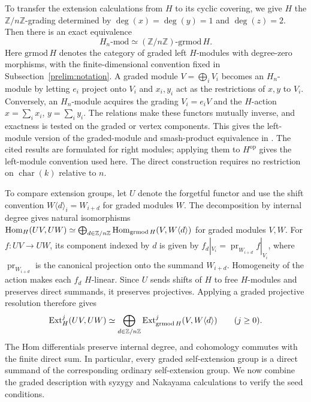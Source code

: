 \documentclass[11pt]{article}
\begin{document}
To transfer the extension calculations from $H$ to its cyclic
covering, we give $H$ the $\mathbb Z/n\mathbb Z$-grading determined by
$\deg(x)=\deg(y)=1$ and $\deg(z)=2$.  Then there is an exact equivalence
\begin{equation}\label{family:graded-equivalence}
 H_n\text{-}\mathrm{mod}\simeq
 (\mathbb Z/n\mathbb Z)\text{-}\mathrm{grmod}\,H.
\end{equation}
Here $\mathrm{grmod}\,H$ denotes the category of graded left
$H$-modules with degree-zero morphisms, with the finite-dimensional
convention fixed in Subsection~\ref{prelim:notation}.
A graded module $V=\bigoplus_iV_i$ becomes an $H_n$-module by letting
$e_i$ project onto $V_i$ and $x_i,y_i$ act as the restrictions of
$x,y$ to $V_i$.  Conversely, an $H_n$-module acquires the grading
$V_i=e_iV$ and the $H$-action $x=\sum_i x_i$, $y=\sum_i y_i$.
The relations make these functors mutually inverse, and exactness
is tested on the graded or vertex components. This gives the left-module version
of the graded-module and smash-product equivalence in
\cite[Theorems~1.3 and~2.1]{NR}. The cited results are formulated
for right modules; applying them to $H^{\mathrm{op}}$ gives the
left-module convention used here. The direct construction requires
no restriction on $\operatorname{char}(k)$ relative to $n$.

To compare extension groups, let $U$ denote the forgetful functor and
use the shift convention $W\langle d\rangle_i=W_{i+d}$ for graded
modules $W$. The decomposition by internal degree gives natural
isomorphisms ${\rm Hom}_H(UV,UW)\simeq
\bigoplus_{d\in\mathbb Z/n\mathbb Z}{\rm Hom}_{\mathrm{grmod}\,H}(V,W\langle d\rangle)$
for graded modules $V,W$. For $f:UV\to UW$, its component indexed
by $d$ is given by
$f_d|_{V_i}=\operatorname{pr}_{W_{i+d}}f|_{V_i}$, where $\operatorname{pr}_{W_{i+d}}$ is the canonical projection onto the summand $W_{i+d}$.
Homogeneity of the action makes each $f_d$ $H$-linear.
Since $U$ sends shifts of $H$ to free $H$-modules and preserves
direct summands, it preserves projectives.
Applying a graded projective resolution therefore gives
\begin{equation}\label{extension-isomorphism}
 {\rm Ext}_H^j(UV,UW)\simeq
 \bigoplus_{d\in\mathbb Z/n\mathbb Z}
 {\rm Ext}_{\mathrm{grmod}\,H}^j(V,W\langle d\rangle)
 \qquad(j\ge0).
\end{equation}
The Hom differentials preserve internal degree, and cohomology
commutes with the finite direct sum.  In particular, every graded self-extension group
is a direct summand of the corresponding ordinary self-extension
group. We now combine the graded description with syzygy and Nakayama calculations
to verify the seed conditions.
\end{document}
